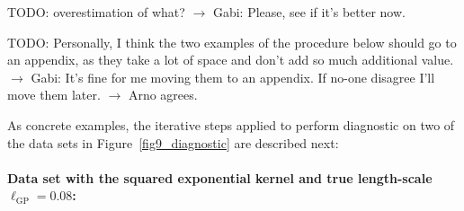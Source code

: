TODO: overestimation of what? $\to$ Gabi: Please, see if it's better now.

TODO: Personally, I think the two examples of the procedure below should go to an appendix, as they take a lot of space and don't add so much additional value. $\to$ Gabi: It's fine for me moving them to an appendix. If no-one disagree I'll move them later. $\to$ Arno agrees.

As concrete examples, the iterative steps applied to perform diagnostic on two of the data sets in Figure~\ref{fig9_diagnostic} are described next:

\paragraph*{Data set with the squared exponential kernel and true length-scale $\ell_{\text{GP}} = 0.08$:} 
